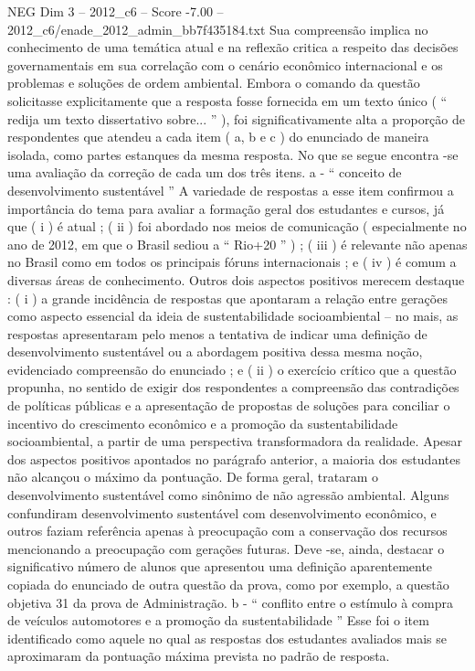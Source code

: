 \begin{textsample}{NEG Dim 3 – 2012\_c6 – Score -7.00 – 2012\_c6/enade\_2012\_admin\_bb7f435184.txt}
Sua compreensão implica no conhecimento de uma temática atual e na reflexão critica a respeito das decisões governamentais em sua correlação com o cenário econômico internacional e os problemas e soluções de ordem ambiental.
Embora o comando da questão solicitasse explicitamente que a resposta fosse fornecida em um texto único ( “ redija um texto dissertativo sobre... ” ), foi significativamente alta a proporção de respondentes que atendeu a cada item ( a, b e c ) do enunciado de maneira isolada, como partes estanques da mesma resposta.
No que se segue encontra -se uma avaliação da correção de cada um dos três itens. a - “ conceito de desenvolvimento sustentável ” A variedade de respostas a esse item confirmou a importância do tema para avaliar a formação geral dos estudantes e cursos, já que ( i ) é atual ; ( ii ) foi abordado nos meios de comunicação ( especialmente no ano de 2012, em que o Brasil sediou a “ Rio+20 ” ) ; ( iii ) é relevante não apenas no Brasil como em todos os principais fóruns internacionais ; e ( iv ) é comum a diversas áreas de conhecimento.
Outros dois aspectos positivos merecem destaque : ( i ) a grande incidência de respostas que apontaram a relação entre gerações como aspecto essencial da ideia de sustentabilidade socioambiental – no mais, as respostas apresentaram pelo menos a tentativa de indicar uma definição de desenvolvimento sustentável ou a abordagem positiva dessa mesma noção, evidenciado compreensão do enunciado ; e ( ii ) o exercício crítico que a questão propunha, no sentido de exigir dos respondentes a compreensão das contradições de políticas públicas e a apresentação de propostas de soluções para conciliar o incentivo do crescimento econômico e a promoção da sustentabilidade socioambiental, a partir de uma perspectiva transformadora da realidade.
Apesar dos aspectos positivos apontados no parágrafo anterior, a maioria dos estudantes não alcançou o máximo da pontuação.
De forma geral, trataram o desenvolvimento sustentável como sinônimo de não agressão ambiental.
Alguns confundiram desenvolvimento sustentável com desenvolvimento econômico, e outros faziam referência apenas à preocupação com a conservação dos recursos mencionando a preocupação com gerações futuras.
Deve -se, ainda, destacar o significativo número de alunos que apresentou uma definição aparentemente copiada do enunciado de outra questão da prova, como por exemplo, a questão objetiva 31 da prova de Administração. b - “ conflito entre o estímulo à compra de veículos automotores e a promoção da sustentabilidade ” Esse foi o item identificado como aquele no qual as respostas dos estudantes avaliados mais se aproximaram da pontuação máxima prevista no padrão de resposta.

\end{textsample}
